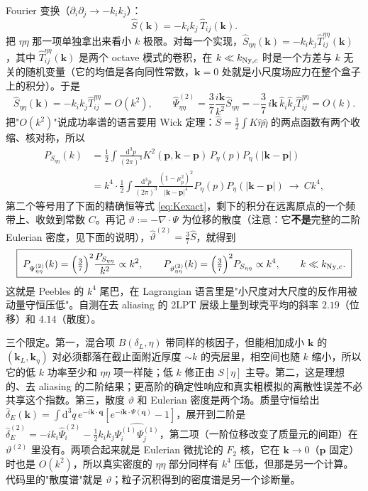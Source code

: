 \documentclass[11pt,UTF8,fontset=none]{ctexart}
\newcommand{\q}{\mathbf{q}}
\newcommand{\kk}{\mathbf{k}}
\newcommand{\dd}{\mathrm{d}}
\newcommand{\Ny}{{\rm Ny}}
\begin{document}
Fourier 变换（$\partial_i\partial_j\to-k_ik_j$）：
\begin{equation}
\hat S(\kk)=-k_ik_j\,\hat T_{ij}(\kk).
\end{equation}
把 $\eta\eta$ 那一项单独拿出来看小 $k$ 极限。对每一个实现，$\hat S_{\eta\eta}(\kk)=-k_ik_j\hat T^{\eta\eta}_{ij}(\kk)$，其中 $\hat T^{\eta\eta}_{ij}(\kk)$ 是两个 octave 模式的卷积，在 $k\ll k_{\Ny,c}$ 时是一个方差与 $k$ 无关的随机变量（它的均值是各向同性常数，$\kk=0$ 处就是小尺度场应力在整个盒子上的积分）。于是
\begin{equation}
\hat S_{\eta\eta}(\kk)=-k_ik_j\hat T^{\eta\eta}_{ij}=O(k^2),\qquad
\hat\Psi^{(2)}_{\eta\eta}=\frac37\frac{i\kk}{k^2}\hat S_{\eta\eta}=-\frac37\,i\kk\,\hat k_i\hat k_j\hat T^{\eta\eta}_{ij}=O(k).
\end{equation}
把"$O(k^2)$"说成功率谱的语言要用 Wick 定理：$\hat S=\frac12\int K\hat\eta\hat\eta$ 的两点函数有两个收缩、核对称，所以
\begin{align}
P_{S_{\eta\eta}}(k)&=\frac12\int\frac{\dd^3p}{(2\pi)^3}K^2(\mathbf p,\kk-\mathbf p)\,P_\eta(p)P_\eta(|\kk-\mathbf p|)\nonumber\\
&=k^4\cdot\frac12\int\frac{\dd^3p}{(2\pi)^3}\frac{(1-\mu_p^2)^2}{|\kk-\mathbf p|^4}P_\eta(p)P_\eta(|\kk-\mathbf p|)\ \to\ Ck^4 ,
\end{align}
第二个等号用了下面的精确恒等式 \eqref{eq:Kexact}，剩下的积分在远离原点的一个频带上、收敛到常数 $C$。再记 $\vartheta:=-\nabla\cdot\Psi$ 为位移的散度（注意：它\textbf{不是}完整的二阶 Eulerian 密度，见下面的说明），$\hat\vartheta^{(2)}=\frac37\hat S$，就得到
\begin{equation}
\boxed{\;P_{\Psi^{(2)}_{\eta\eta}}(k)=\Big(\tfrac37\Big)^2\frac{P_{S_{\eta\eta}}}{k^2}\propto k^2,\qquad
P_{\vartheta^{(2)}_{\eta\eta}}(k)=\Big(\tfrac37\Big)^2P_{S_{\eta\eta}}\propto k^4,\qquad k\ll k_{\Ny,c}.\;}
\end{equation}
这就是 Peebles 的 $k^4$ 尾巴，在 Lagrangian 语言里是"小尺度对大尺度的反作用被动量守恒压低"。自测在去 aliasing 的 2LPT 层级上量到球壳平均的斜率 $2.19$（位移）和 $4.14$（散度）。

三个限定。第一，混合项 $B(\delta_L,\eta)$ 带同样的核因子，但能相加成小 $\kk$ 的 $(\kk_L,\kk_\eta)$ 对必须都落在截止面附近厚度 $\sim k$ 的壳层里，相空间也随 $k$ 缩小，所以它的低 $k$ 功率至少和 $\eta\eta$ 项一样陡；低 $k$ 修正由 $S[\eta]$ 主导。第二，这是理想的、去 aliasing 的二阶结果；更高阶的确定性响应和真实粗模拟的离散性误差不必共享这个指数。第三，散度 $\vartheta$ 和 Eulerian 密度是两个场。质量守恒给出 $\hat\delta_E(\kk)=\int\dd^3q\,e^{-i\kk\cdot\q}[e^{-i\kk\cdot\Psi(\q)}-1]$，展开到二阶是 $\hat\delta^{(2)}_E=-ik_i\hat\Psi^{(2)}_i-\tfrac12k_ik_j\widehat{\Psi^{(1)}_i\Psi^{(1)}_j}$，第二项（一阶位移改变了质量元的间距）在 $\vartheta^{(2)}$ 里没有。两项合起来就是 Eulerian 微扰论的 $F_2$ 核，它在 $\kk\to0$（$\mathbf p$ 固定）时也是 $O(k^2)$，所以真实密度的 $\eta\eta$ 部分同样有 $k^4$ 压低，但那是另一个计算。代码里的"散度谱"就是 $\vartheta$；粒子沉积得到的密度谱是另一个诊断量。
\end{document}

